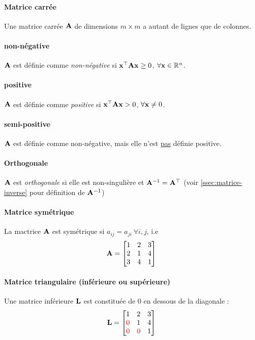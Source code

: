 \documentclass[12pt, french]{report}
\begin{document}
\paragraph{Matrice carrée} Une matrice carrée $\mathbf{A}$ de dimensions $m \times m$ a autant de lignes que de colonnes.

\paragraph{non-négative} $\mathbf{A}$ est définie comme \textit{non-négative} si $\mathbf{x^{\top} A x }\geq 0$, $\forall \mathbf{x}\in \mathbb{R}^n$.

\paragraph{positive} $\mathbf{A}$ est définie comme \textit{positive} si $\mathbf{x^{\top} A x} > 0$, $\forall \mathbf{x} \neq 0$.

\paragraph{semi-positive} $\mathbf{A}$ est définie comme non-négative, mais elle n'est \underline{pas} définie positive.

\paragraph{Orthogonale} $\mathbf{A}$ est \textit{orthogonale} si elle est non-singulière et $\mathbf{A}^{-1} = \mathbf{A}^{\top}$ (voir \autoref{ssec:matrice-inverse} pour définition de $\mathbf{A}^{-1}$)


\paragraph{Matrice symétrique} La mactrice $\mathbf{A}$ est symétrique si  $a_{ij} = a_{ji}  \ \forall i,j$, i.e
\begin{align*}
\mathbf{A} = 
\begin{bmatrix}
1     & 2    &  3   \\
2     & 1   & 4 \\
3   & 4   & 1 \\
\end{bmatrix}
\end{align*}

\paragraph{Matrice triangulaire (inférieure ou supérieure)} Une matrice inférieure $\mathbf{L}$ est constituée de 0 en dessous de la diagonale : 
\begin{align*}
\mathbf{L} = 
\begin{bmatrix}
1     & 2    &  3   \\
\textcolor{red}{0}     & 1   & 4 \\
\textcolor{red}{0}   & \textcolor{red}{0}   & 1 \\
\end{bmatrix}
\end{align*}
\end{document}
